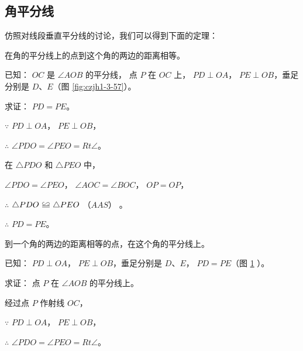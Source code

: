 \subsection{角平分线}\label{subsec:czjh1-3-16}

仿照对线段垂直平分线的讨论，我们可以得到下面的定理：

\begin{dingli}[定理]
    在角的平分线上的点到这个角的两边的距离相等。
\end{dingli}

已知： $OC$ 是 $\angle AOB$ 的平分线， 点 $P$ 在 $OC$ 上， $PD \perp OA$，
$PE \perp OB$，垂足分别是 $D$、$E$（图 \ref{fig:czjh1-3-57}）。

求证： $PD = PE$。

\zhengming $\because$ \quad $PD \perp OA$， $PE \perp OB$，

$\therefore$ \quad $\angle PDO = \angle PEO = Rt \angle$。

在 $\triangle PDO$ 和 $\triangle PEO$ 中，

$\angle PDO = \angle PEO$， $\angle AOC = \angle BOC$， $OP = OP$，

$\therefore$ \quad $\triangle PDO \quandeng \triangle PEO$ （$AAS$） 。

$\therefore$ \quad $PD = PE$。

\begin{figure}[htbp]
    \centering
    \begin{minipage}[b]{7cm}
        \centering
        
        \caption{}\label{fig:czjh1-3-57}
    \end{minipage}
    \qquad
    \begin{minipage}[b]{7cm}
        \centering
        
        \caption{}\label{fig:czjh1-3-58}
    \end{minipage}
\end{figure}


\begin{dingli}[逆定理]
    到一个角的两边的距离相等的点，在这个角的平分线上。
\end{dingli}

已知： $PD \perp OA$， $PE \perp OB$，垂足分别是 $D$、$E$， $PD = PE$（图 \ref{fig:czjh1-3-58} ）。

求证： 点 $P$ 在 $\angle AOB$ 的平分线上。

\zhengming 经过点 $P$ 作射线 $OC$，

$\because$ \quad $PD \perp OA$， $PE \perp OB$，

$\therefore$ \quad $\angle PDO = \angle PEO = Rt \angle$。

